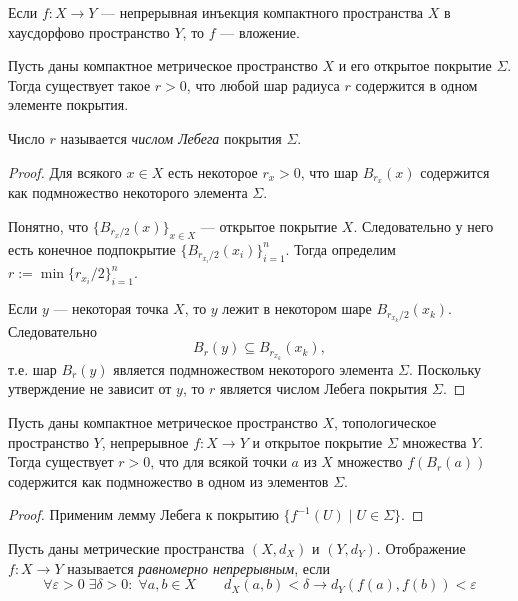 \documentclass[12pt,a4paper]{article}
\begin{document}
    \begin{corollary}
        Если $f: X \to Y$ --- непрерывная инъекция компактного пространства $X$ в хаусдорфово пространство $Y$, то $f$ --- вложение.
    \end{corollary}

    \begin{lemma}[Лебега]
        Пусть даны компактное метрическое пространство $X$ и его открытое покрытие $\Sigma$. Тогда существует такое $r > 0$, что любой шар радиуса $r$ содержится в одном элементе покрытия.
    \end{lemma}

    \begin{definition}
        Число $r$ называется \emph{числом Лебега} покрытия $\Sigma$.
    \end{definition}

    \begin{proof}
        Для всякого $x \in X$ есть некоторое $r_x > 0$, что шар $B_{r_x}(x)$ содержится как подмножество некоторого элемента $\Sigma$.

        Понятно, что $\{B_{r_x/2}(x)\}_{x \in X}$ --- открытое покрытие $X$. Следовательно у него есть конечное подпокрытие $\{B_{r_{x_i}/2}(x_i)\}_{i=1}^n$. Тогда определим $r := \min \{r_{x_i}/2\}_{i=1}^n$.

        Если $y$ --- некоторая точка $X$, то $y$ лежит в некотором шаре $B_{r_{x_k}/2}(x_k)$. Следовательно
        \[B_r(y) \subseteq B_{r_{x_k}}(x_k),\]
        т.е. шар $B_r(y)$ является подмножеством некоторого элемента $\Sigma$. Поскольку утверждение не зависит от $y$, то $r$ является числом Лебега покрытия $\Sigma$.
    \end{proof}

    \begin{corollary}
        Пусть даны компактное метрическое пространство $X$, топологическое пространство $Y$, непрерывное $f: X \to Y$ и открытое покрытие $\Sigma$ множества $Y$. Тогда существует $r > 0$, что для всякой точки $a$ из $X$ множество $f(B_r(a))$ содержится как подмножество в одном из элементов $\Sigma$.
    \end{corollary}

    \begin{proof}
        Применим лемму Лебега к покрытию $\{f^{-1}(U) \mid U \in \Sigma\}$.
    \end{proof}

    \begin{definition}
        Пусть даны метрические пространства $(X, d_X)$ и $(Y, d_Y)$. Отображение $f: X \to Y$ называется \emph{равномерно непрерывным}, если
        \[\forall \varepsilon > 0\; \exists \delta > 0:\; \forall a, b \in X\qquad d_X(a, b) < \delta \longrightarrow d_Y(f(a), f(b)) < \varepsilon\]
    \end{definition}
\end{document}
